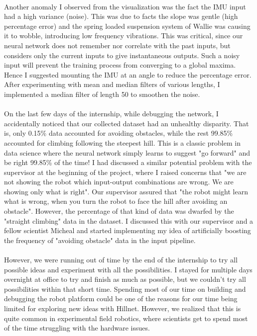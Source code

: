 \paragraph{}
Another anomaly I observed from the visualization was the fact the IMU input had a high variance (noise). This was due to facts the slope was gentle (high percentage error) and the spring loaded suspension system of Wallie was causing it to wobble, introducing low frequency vibrations. This was critical, since our neural network does not remember nor correlate with the past inputs, but considers only the current inputs to give instantaneous outputs. Such a noisy input will prevent the training process from converging to a global maxima. Hence I suggested mounting the IMU at an angle to reduce the percentage error. After experimenting with mean and median filters of various lengths, I implemented a median filter of length 50 to smoothen the noise.

\paragraph{}
On the last few days of the internship, while debugging the network, I accidentally noticed that our collected dataset had an unhealthy disparity. That is, only 0.15\% data accounted for avoiding obstacles, while the rest 99.85\% accounted for climbing following the steepest hill. This is a classic problem in data science where the neural network simply learns to suggest "go forward" and be right 99.85\% of the time! I had discussed a similar potential problem with the supervisor at the beginning of the project, where I raised concerns that "we are not showing the robot which input-output combinations are wrong. We are showing only what is right". Our supervisor assured that "the robot might learn what is wrong, when you turn the robot to face the hill after avoiding an obstacle". However, the percentage of that kind of data was dwarfed by the "straight climbing" data in the dataset. I discussed this with our supervisor and a fellow scientist Micheal and started implementing my idea of artificially boosting the frequency of "avoiding obstacle" data in the input pipeline.

\paragraph{}
However, we were running out of time by the end of the internship to try all possible ideas and experiment with all the possibilities. I stayed for multiple days overnight at office to try and finish as much as possible, but we couldn't try all possibilities within that short time. Spending most of our time on building and debugging the robot platform could be one of the reasons for our time being limited for exploring new ideas with Hillnet. However, we realized that this is quite common in experimental field robotics, where scientists get to spend most of the time struggling with the hardware issues. 